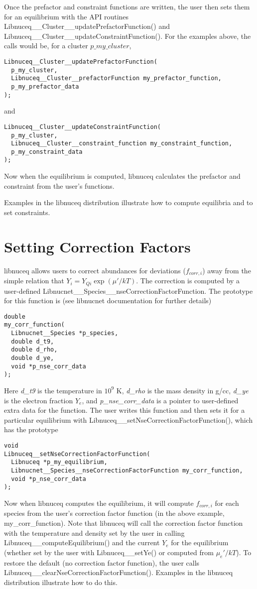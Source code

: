 \documentclass{article}    %
\begin{document}
\begin{enumerate}
Once the prefactor and constraint functions are written, the user then
sets them for an equilibrium with the API routines
Libnuceq\_\_Cluster\_\_updatePrefactorFunction()
and
Libnuceq\_\_Cluster\_\_updateConstraintFunction().  For the examples above,
the calls would be, for a cluster $p\_my\_cluster$,
\begin{verbatim}
Libnuceq__Cluster__updatePrefactorFunction(
  p_my_cluster,
  Libnuceq__Cluster__prefactorFunction my_prefactor_function,
  p_my_prefactor_data
);
\end{verbatim}
and
\begin{verbatim}
Libnuceq__Cluster__updateConstraintFunction(
  p_my_cluster,
  Libnuceq__Cluster__constraint_function my_constraint_function,
  p_my_constraint_data
);
\end{verbatim}
Now when the equilibrium is computed, libnuceq calculates the prefactor
and constraint from the user's functions.

\end{enumerate}

Examples in the libnuceq distribution illustrate how to compute equilibria
and to set constraints.

\section{Setting Correction Factors}

libnuceq allows users to correct abundances for deviations ($f_{corr,i}$)
away from the simple relation that $Y_i = Y_{Qi}\exp(\mu'/kT)$.
The correction is computed by a user-defined
Libnucnet\_\_Species\_\_nseCorrectionFactorFunction.  The prototype
for this function is (see libnucnet documentation for further details)
\begin{verbatim}
double
my_corr_function(
  Libnucnet__Species *p_species,
  double d_t9,
  double d_rho,
  double d_ye,
  void *p_nse_corr_data
);
\end{verbatim}
Here {\em d\_t9} is the temperature in $10^9$ K, {\em d\_rho}
is the mass density
in g/cc, {\em d\_ye} is the electron fraction $Y_e$, and
{\em p\_nse\_corr\_data}
is a pointer to user-defined extra data for the function.  The user
writes this function and then sets it for a particular equilibrium with
Libnuceq\_\_setNseCorrectionFactorFunction(), which has the prototype
\begin{verbatim}
void
Libnuceq__setNseCorrectionFactorFunction(
  Libnuceq *p_my_equilibrium,
  Libnucnet__Species__nseCorrectionFactorFunction my_corr_function,
  void *p_nse_corr_data
);
\end{verbatim}
Now when libnuceq computes the equilibrium, it will compute $f_{corr,i}$
for each species from the user's correction factor function (in the
above example, my\_corr\_function).  Note that libnuceq will call
the correction factor function with the temperature and density set
by the user in calling Libnuceq\_\_computeEquilibrium() and the
current $Y_e$ for the equilibrium (whether set by the user with
Libnuceq\_\_setYe() or computed from $\mu_e'/kT$).  To restore the default
(no correction factor function), the user calls
Libnuceq\_\_clearNseCorrectionFactorFunction().  Examples in the
libnuceq distribution illustrate how to do this.
\end{document}
